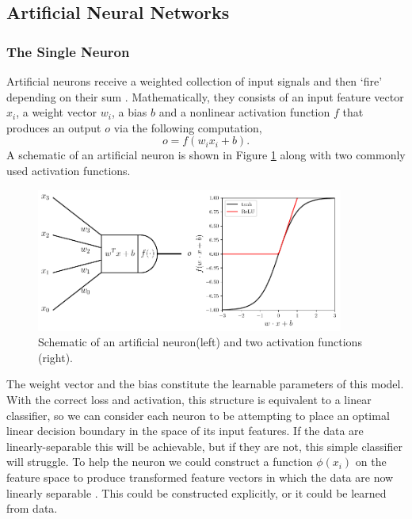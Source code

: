 \subsection{Artificial Neural Networks}

\subsubsection{The Single Neuron}
Artificial neurons receive a weighted collection of input signals and then `fire' depending on their sum \cite{CS231n}. Mathematically, they consists of an input feature vector $x_{i}$, a weight vector $w_{i}$, a bias $b$ and a nonlinear activation function $f$ that produces an output $o$ via the following computation,
\begin{equation}
    o = f(w_{i}x_{i} + b).
\end{equation}
A schematic of an artificial neuron is shown in Figure \ref{fig:machine_learning:neuron_and_activation} along with two commonly used activation functions. 
\begin{figure}[h!]
    \begin{center}
        \includegraphics[width=0.9\textwidth]{figures/machine_learning/neuron_and_activation.pdf}
    \end{center}
    \caption{Schematic of an artificial neuron(left) and two activation functions (right).}
        \label{fig:machine_learning:neuron_and_activation}
\end{figure}
The weight vector and the bias constitute the learnable parameters of this model. 
With the correct loss and activation, this structure is equivalent to a linear classifier, so we can consider each neuron to be attempting to place an optimal linear decision boundary in the space of its input features. 
If the data are linearly-separable this will be achievable, but if they are not, this simple classifier will struggle. 
To help the neuron we could construct a function $\phi(x_{i})$ on the feature space to produce transformed feature vectors in which the data are now linearly separable \cite{DeepLearningBook}. 
This could be constructed explicitly, or it could be learned from data. 



